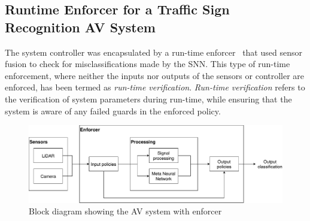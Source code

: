 \subsection{Runtime Enforcer for a Traffic Sign Recognition AV System}
The system controller was encapsulated by a run-time enforcer~\cite{recps} that used sensor fusion to check for misclassifications made by the \ac{SNN}.
This type of run-time enforcement, where neither the inputs nor outputs of the sensors or controller are enforced, has been termed as \textit{run-time verification}.
\textit{Run-time verification} refers to the verification of system parameters during run-time, while ensuring that the system is aware of any failed guards in the enforced policy.

\begin{figure}[t]
	\centering
	\includegraphics[scale=0.6]{Content/fig/SSNN.pdf}
	\caption{Block diagram showing the \acf{AV} system with enforcer}
	\label{fig:ssnn}
\end{figure}






















